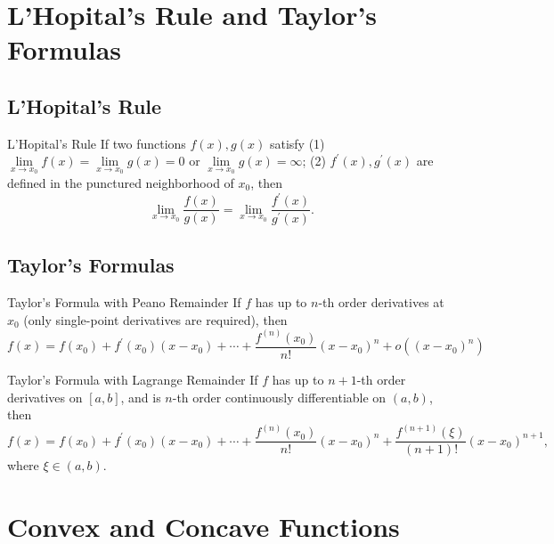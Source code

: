 \section{L'Hopital's Rule and Taylor's Formulas}

\subsection{L'Hopital's Rule}

\begin{theorem}{L'Hopital's Rule}{}
  If two functions $f(x), g(x)$ satisfy
  (1)$\lim \limits _{x \rightarrow x_0} f(x) = \lim \limits _{x \rightarrow x_0}
  g(x) = 0$ or
  $\lim \limits _{x \rightarrow x_0} g(x) = \infty$;
  (2) $f^{\prime}(x), g^{\prime}(x)$ are defined in the punctured neighborhood
  of $x_0$, then
  \begin{equation}
    \lim \limits _{x \rightarrow x_0} \frac{f(x)}{g(x)}
    = \lim \limits _{x \rightarrow x_0} \frac{f^{\prime}(x)}{g^{\prime}(x)}.
  \end{equation}
\end{theorem}


\subsection{Taylor's Formulas}

\begin{theorem}{Taylor's Formula with Peano Remainder}{}
  If $f$ has up to $n$-th order derivatives at $x_0$ (only single-point
  derivatives are required), then
  \begin{equation}
    f(x)=f(x_0)+f^{\prime}(x_0)(x-x_0)+\cdots+\frac{f^{(n)}(x_0)}{n!}(x-x_0)^n+o((x-x_0)^n)
  \end{equation}
\end{theorem}

\begin{theorem}{Taylor's Formula with Lagrange Remainder}{}
  If $f$ has up to $n + 1$-th order derivatives on $[a, b]$,
  and is $n$-th order continuously differentiable on $(a, b)$,
  then
  \begin{equation}
    f(x)=f(x_0)+f^{\prime}(x_0)(x-x_0)+\cdots+\frac{f^{(n)}(x_0)}{n!}(x-x_0)^n+\frac{f^{(n+1)}(\xi)}{(n+1)!}(x-x_0)^{n+1},
  \end{equation}
  where $\xi \in (a, b)$.
\end{theorem}

\section{Convex and Concave Functions}

